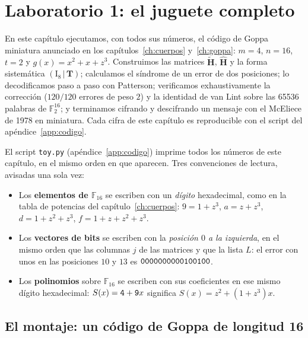 \documentclass[11pt,a4paper,oneside]{report}
\newcommand{\F}{\mathbb{F}}
\newcommand{\GF}[1]{\mathbb{F}_{#1}}
\newcommand{\Hmat}{\mathbf{H}}          %
\newcommand{\Tmat}{\mathbf{T}}          %
\newcommand{\Ftwo}{\F_2}
\newcommand{\hx}[1]{\text{\texttt{#1}}}
\begin{document}
\chapter{Laboratorio 1: el juguete completo}\label{ch:labgoppa}

\begin{roadmap}
En este capítulo ejecutamos, con todos sus números, el código de Goppa
miniatura anunciado en los capítulos~\ref{ch:cuerpos} y~\ref{ch:goppa}:
$m=4$, $n=16$, $t=2$ y $g(x)=x^2+x+z^3$. Construimos las matrices
$\tilde{\Hmat}$, $\hat{\Hmat}$ y la forma sistemática
$(\mathrm{I}_8\,|\,\Tmat)$; calculamos el síndrome de un error de dos
posiciones; lo decodificamos paso a paso con Patterson; verificamos
exhaustivamente la corrección ($120/120$ errores de peso $2$) y la
identidad de van Lint sobre las \num{65536} palabras de $\Ftwo^{16}$; y
terminamos cifrando y descifrando un mensaje con el McEliece de 1978 en
miniatura. Cada cifra de este capítulo es reproducible con el script del
apéndice~\ref{app:codigo}.
\end{roadmap}

\begin{lab}
El script \texttt{toy.py} (apéndice~\ref{app:codigo}) imprime todos los
números de este capítulo, en el mismo orden en que aparecen. Tres
convenciones de lectura, avisadas una sola vez:
\begin{itemize}[leftmargin=1.3em,itemsep=2pt]
  \item Los \textbf{elementos de $\GF{16}$} se escriben con un
        \emph{dígito} hexadecimal, como en la tabla de potencias del
        capítulo~\ref{ch:cuerpos}: $9=1+z^3$, $a=z+z^3$,
        $d=1+z^2+z^3$, $f=1+z+z^2+z^3$.
  \item Los \textbf{vectores de bits} se escriben con la \emph{posición
        $0$ a la izquierda}, en el mismo orden que las columnas $j$ de
        las matrices y que la lista $L$: el error con unos en las
        posiciones $10$ y $13$ es $\hx{0000000000100100}$.
  \item Los \textbf{polinomios} sobre $\GF{16}$ se escriben con sus
        coeficientes en ese mismo dígito hexadecimal:
        $S(x)=\hx{4}+\hx{9}x$ significa $S(x)=z^2+(1+z^3)x$.
\end{itemize}
\end{lab}

\section{El montaje: un código de Goppa de longitud 16}
\end{document}
